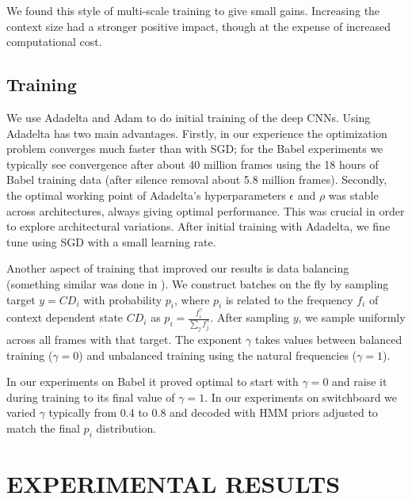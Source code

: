 \documentclass{article}
\begin{document}
We found this style of multi-scale training to give small gains. 
Increasing the context size had a stronger positive impact, though
at the expense of increased computational cost.

\subsection{Training}
\label{ssec:training}

We use Adadelta \cite{zeiler2012adadelta} and Adam \cite{kingma2014adam} to do initial training
of the deep CNNs. Using Adadelta has two main advantages. Firstly, in our experience the optimization
problem converges much faster than with SGD; for the Babel experiments
we typically see convergence after about 40 million frames
using the 18 hours of Babel training data (after silence removal about 5.8 million frames).
Secondly, the optimal working point of Adadelta's hyperparameters $\epsilon$ and $\rho$ 
was stable across architectures, always giving optimal performance. This was crucial in order to 
explore architectural variations.
After initial training with Adadelta, we fine tune using SGD with a small learning rate.

Another aspect of training that improved our results is data balancing (something similar 
was done in \cite{sermanet2013overfeat}). We construct batches on the fly
by sampling target $y=CD_i$ with probability $p_i$, where $p_i$ is related to the frequency $f_i$ of
context dependent state $CD_i$ as $p_i = \frac{f_i^\gamma}{\sum_j f_j^\gamma}$.
After sampling $y$, we sample uniformly across all frames with that target.
The exponent $\gamma$ takes values between balanced training ($\gamma=0$) and
unbalanced training using the natural frequencies ($\gamma=1$).

In our experiments on Babel it proved optimal to start with $\gamma=0$ and raise
it during training to its final value of $\gamma=1$.
In our experiments on switchboard we varied $\gamma$ typically from 0.4 to 0.8
and decoded with HMM priors adjusted to match the final $p_i$ distribution.

\section{EXPERIMENTAL RESULTS}
\end{document}
